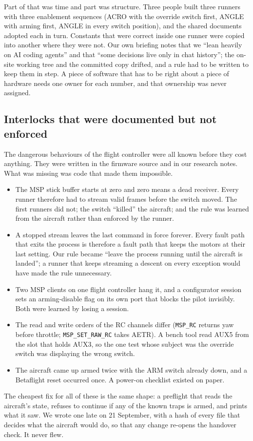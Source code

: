 \documentclass{article}
\begin{document}
Part of that was time and part was structure. Three people built three runners with three enablement sequences (ACRO with the override switch first, ANGLE with arming first, ANGLE in every switch position), and the shared documents adopted each in turn. Constants that were correct inside one runner were copied into another where they were not. Our own briefing notes that we ``lean heavily on AI coding agents'' and that ``some decisions live only in chat history''; the on-site working tree and the committed copy drifted, and a rule had to be written to keep them in step. A piece of software that has to be right about a piece of hardware needs one owner for each number, and that ownership was never assigned.

\subsection{Interlocks that were documented but not enforced}
The dangerous behaviours of the flight controller were all known before they cost anything. They were written in the firmware source and in our research notes. What was missing was code that made them impossible.

\begin{itemize}[leftmargin=*]
\item The MSP stick buffer starts at zero and zero means a dead receiver. Every runner therefore had to stream valid frames before the switch moved. The first runners did not; the switch ``killed'' the aircraft; and the rule was learned from the aircraft rather than enforced by the runner.
\item A stopped stream leaves the last command in force forever. Every fault path that exits the process is therefore a fault path that keeps the motors at their last setting. Our rule became ``leave the process running until the aircraft is landed''; a runner that keeps streaming a descent on every exception would have made the rule unnecessary.
\item Two MSP clients on one flight controller hang it, and a configurator session sets an arming-disable flag on its own port that blocks the pilot invisibly. Both were learned by losing a session.
\item The read and write orders of the RC channels differ (\texttt{MSP\_RC} returns yaw before throttle; \texttt{MSP\_SET\_RAW\_RC} takes AETR). A bench tool read AUX5 from the slot that holds AUX3, so the one test whose subject was the override switch was displaying the wrong switch.
\item The aircraft came up armed twice with the ARM switch already down, and a Betaflight reset occurred once. A power-on checklist existed on paper.
\end{itemize}
The cheapest fix for all of these is the same shape: a preflight that reads the aircraft's state, refuses to continue if any of the known traps is armed, and prints what it saw. We wrote one late on 21 September, with a hash of every file that decides what the aircraft would do, so that any change re-opens the handover check. It never flew.
\end{document}
